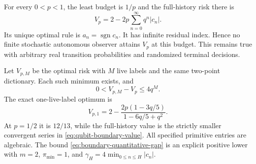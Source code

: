 \begin{theorem}\label{thm:qubit-boundary}
For every $0<p<1$, the least budget is $1/p$ and the full-history risk there is
\begin{equation}\label{eq:qubit-boundary-value}
 V_p=2-2p\sum_{n=0}^\infty q^n|c_n|.
\end{equation}
Its unique optimal rule is $a_n=\operatorname{sgn}c_n$. It has infinite residual index. Hence no finite stochastic autonomous observer attains $V_p$ at this budget. This remains true with arbitrary real transition probabilities and randomized terminal decisions.

Let $V_{p,M}$ be the optimal risk with $M$ live labels and the same two-point dictionary. Each such minimum exists, and
\begin{equation}\label{eq:qubit-memory-gap}
 0<V_{p,M}-V_p\le4q^M.
\end{equation}
The exact one-live-label optimum is
\begin{equation}\label{eq:qubit-one-label}
 V_{p,1}=2-\frac{2p(1-3q/5)}{1-6q/5+q^2}.
\end{equation}
At $p=1/2$ it is $12/13$, while the full-history value is the strictly smaller convergent series in \eqref{eq:qubit-boundary-value}. All specified primitive entries are algebraic. The bound \eqref{eq:boundary-quantitative-gap} is an explicit positive lower with $m=2$, $\pi_{\min}=1$, and $\gamma_H=4\min_{0\le n\le H}|c_n|$.
\end{theorem}
